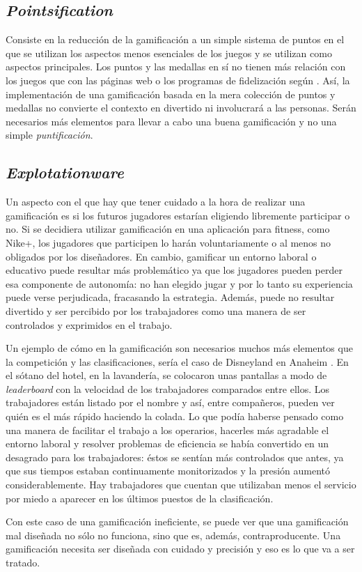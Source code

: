 \subsection{\textit{Pointsification}}

Consiste en la reducción de la gamificación a un simple sistema de puntos en el que se utilizan los aspectos menos esenciales de los juegos y se utilizan como aspectos principales.
%
Los puntos y las medallas en sí no tienen más relación con los juegos que con las páginas web o los programas de fidelización según \cite{Pointsification}.
%
Así, la implementación de una gamificación basada en la mera colección de puntos y medallas no convierte el contexto en divertido ni involucrará a las personas. 
%
Serán necesarios más elementos para llevar a cabo una buena gamificación y no una simple \textit{puntificación}.

\subsection{\textit{Explotationware}}

Un aspecto con el que hay que tener cuidado a la hora de realizar una gamificación es si los futuros jugadores estarían eligiendo libremente participar o no.
%
Si se decidiera utilizar gamificación en una aplicación para fitness, como Nike+, los jugadores que participen lo harán voluntariamente o al menos no obligados por los diseñadores.
%
En cambio, gamificar un entorno laboral o educativo puede resultar más problemático ya que los jugadores pueden perder esa componente de autonomía: no han elegido jugar y por lo tanto su experiencia puede verse perjudicada, fracasando la estrategia.
%
Además, puede no resultar divertido y ser percibido por los trabajadores como una manera de ser controlados y exprimidos en el trabajo.

Un ejemplo de cómo en la gamificación son necesarios muchos más elementos que la competición y las clasificaciones, sería el caso de Disneyland en Anaheim \citep{Explotationware}.
%
En el sótano del hotel, en la lavandería, se colocaron unas pantallas a modo de \textit{leaderboard} con la velocidad de los trabajadores comparados entre ellos.
%
Los trabajadores están listado por el nombre y así, entre compañeros, pueden ver quién es el más rápido haciendo la colada.
%
Lo que podía haberse pensado como una manera de facilitar el trabajo a los operarios, hacerles más agradable el entorno laboral y resolver problemas de eficiencia se había convertido en un desagrado para los trabajadores: éstos se sentían más controlados que antes, ya que sus tiempos estaban continuamente monitorizados y la presión aumentó considerablemente. 
%
Hay trabajadores que cuentan que utilizaban menos el servicio por miedo a aparecer en los últimos puestos de la clasificación.


Con este caso de una gamificación ineficiente, se puede ver que una gamificación mal diseñada no sólo no funciona, sino que es, además, contraproducente. 
%
Una gamificación necesita ser diseñada con cuidado y precisión y eso es lo que va a ser tratado.


